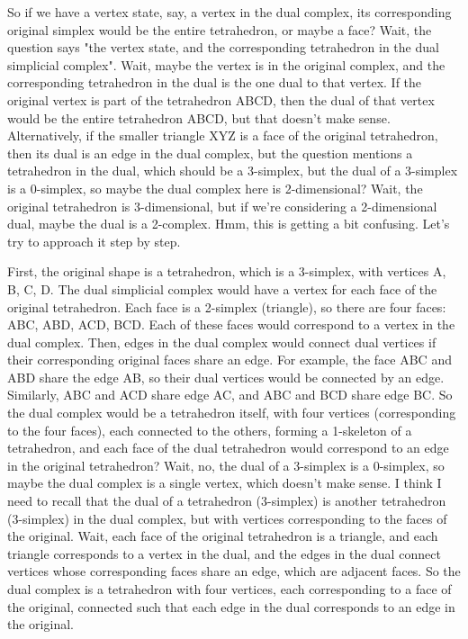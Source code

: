 So if we have a vertex state, say, a vertex in the dual complex, its corresponding original simplex would be the entire tetrahedron, or maybe a face? Wait, the question says "the vertex state, and the corresponding tetrahedron in the dual simplicial complex". Wait, maybe the vertex is in the original complex, and the corresponding tetrahedron in the dual is the one dual to that vertex. If the original vertex is part of the tetrahedron ABCD, then the dual of that vertex would be the entire tetrahedron ABCD, but that doesn't make sense. Alternatively, if the smaller triangle XYZ is a face of the original tetrahedron, then its dual is an edge in the dual complex, but the question mentions a tetrahedron in the dual, which should be a 3-simplex, but the dual of a 3-simplex is a 0-simplex, so maybe the dual complex here is 2-dimensional? Wait, the original tetrahedron is 3-dimensional, but if we're considering a 2-dimensional dual, maybe the dual is a 2-complex. Hmm, this is getting a bit confusing. Let's try to approach it step by step.

First, the original shape is a tetrahedron, which is a 3-simplex, with vertices A, B, C, D. The dual simplicial complex would have a vertex for each face of the original tetrahedron. Each face is a 2-simplex (triangle), so there are four faces: ABC, ABD, ACD, BCD. Each of these faces would correspond to a vertex in the dual complex. Then, edges in the dual complex would connect dual vertices if their corresponding original faces share an edge. For example, the face ABC and ABD share the edge AB, so their dual vertices would be connected by an edge. Similarly, ABC and ACD share edge AC, and ABC and BCD share edge BC. So the dual complex would be a tetrahedron itself, with four vertices (corresponding to the four faces), each connected to the others, forming a 1-skeleton of a tetrahedron, and each face of the dual tetrahedron would correspond to an edge in the original tetrahedron? Wait, no, the dual of a 3-simplex is a 0-simplex, so maybe the dual complex is a single vertex, which doesn't make sense. I think I need to recall that the dual of a tetrahedron (3-simplex) is another tetrahedron (3-simplex) in the dual complex, but with vertices corresponding to the faces of the original. Wait, each face of the original tetrahedron is a triangle, and each triangle corresponds to a vertex in the dual, and the edges in the dual connect vertices whose corresponding faces share an edge, which are adjacent faces. So the dual complex is a tetrahedron with four vertices, each corresponding to a face of the original, connected such that each edge in the dual corresponds to an edge in the original. 

